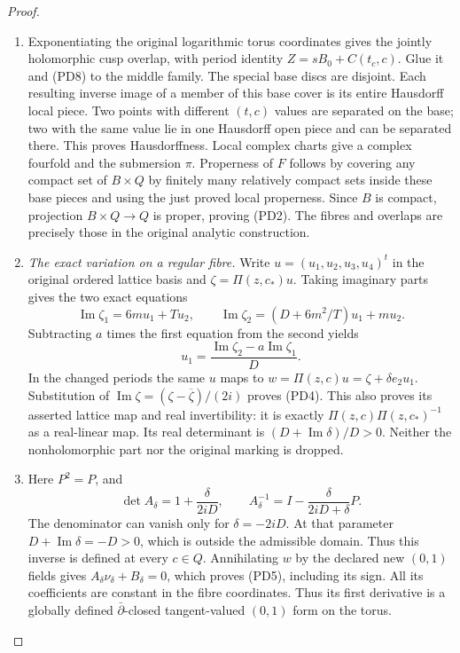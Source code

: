 \begin{proof}
\begin{enumerate}[label=\arabic*.,leftmargin=*]
\item Exponentiating the original logarithmic torus coordinates gives the
jointly holomorphic cusp overlap, with period identity
$Z=sB_0+C(t_c,c)$. Glue it and (PD8) to the middle family.
The special base discs are disjoint. Each resulting inverse image of
a member of this base cover is its entire Hausdorff local piece.
Two points with different $(t,c)$ values are separated on the base;
two with the same value lie in one Hausdorff open piece and can be
separated there. This proves Hausdorffness. Local complex charts give
a complex fourfold and the submersion $\pi$.
Properness of $F$ follows by covering any compact set of $B\times Q$
by finitely many relatively compact sets inside these base pieces and
using the just proved local properness. Since $B$ is compact, projection
$B\times Q\to Q$ is proper, proving (PD2). The fibres and overlaps
are precisely those in the original analytic construction.

\item \emph{The exact variation on a regular fibre.}
Write $u=(u_1,u_2,u_3,u_4)^t$ in the original ordered lattice basis and
$\zeta=\Pi(z,c_*)u$. Taking imaginary parts gives the two exact equations
\[
 \operatorname{Im}\zeta_1=6m u_1+T u_2,\qquad
 \operatorname{Im}\zeta_2=(D+6m^2/T)u_1+m u_2.
 \tag{PD13}
\]
Subtracting $a$ times the first equation from the second yields
\[
 u_1=\frac{\operatorname{Im}\zeta_2-a\operatorname{Im}\zeta_1}{D}.
 \tag{PD14}
\]
In the changed periods the same $u$ maps to
$w=\Pi(z,c)u=\zeta+\delta e_2u_1$. Substitution of
$\operatorname{Im}\zeta=(\zeta-\overline\zeta)/(2i)$ proves (PD4).
This also proves its asserted lattice map and real invertibility:
it is exactly $\Pi(z,c)\Pi(z,c_*)^{-1}$ as a real-linear map.
Its real determinant is $(D+\operatorname{Im}\delta)/D>0$.
Neither the nonholomorphic part nor the original marking is dropped.

\item Here $P^2=P$, and
\[
 \det A_\delta=1+\frac\delta{2iD},\qquad
 A_\delta^{-1}=I-\frac{\delta}{2iD+\delta}P.
 \tag{PD15}
\]
The denominator can vanish only for $\delta=-2iD$. At that parameter
$D+\operatorname{Im}\delta=-D>0$, which is outside the admissible
domain. Thus this inverse is defined at every $c\in Q$.
Annihilating $w$ by the declared new $(0,1)$ fields gives
$A_\delta\nu_\delta+B_\delta=0$, which proves (PD5), including
its sign. All its coefficients are constant in the fibre coordinates.
Thus its first derivative is a globally defined $\bar\partial$-closed
tangent-valued $(0,1)$ form on the torus.


\end{enumerate}
\end{proof}
